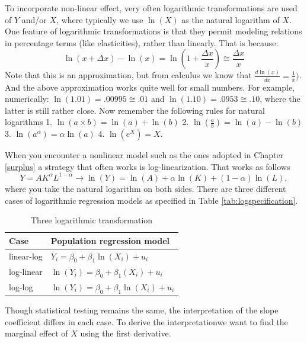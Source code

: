\documentclass[
]{book}
\begin{document}
To incorporate non-linear effect, very often logarithmic transformations are used of \(Y\) and/or \(X\), where typically we use \(\ln(X)\) as the natural logarithm of \(X\). One feature of logarithmic transformations is that they permit modeling relations in percentage terms (like elasticities), rather than linearly. That is because:
\begin{equation}
\ln(x+\Delta x) - \ln(x) = \ln (1 + \frac{\Delta x}{x}) \cong \frac{\Delta x}{x}
\end{equation}
Note that this is an approximation, but from calculus we know that \(\frac{d \ln(x)}{dx}=\frac{1}{x})\). And the above approximation works quite well for small numbers. For example, numerically: \(\ln(1.01) = .00995 \cong .01\) and \(\ln(1.10) = .0953 \cong .10\), where the latter is still rather close. Now remember the following rules for natural logarithms
1. \(\ln(a\times b)= \ln(a)+\ln(b)\)
2. \(\ln(\frac{a}{b}) =\ln(a) - \ln(b)\)
3. \(\ln(a^\alpha) = \alpha \ln(a)\)
4. \(\ln(e^X) = X\).

When you encounter a nonlinear model such as the ones adopted in Chapter \ref{surplus} a strategy that often works is log-linearization. That works as follows
\begin{equation}
Y = A K^\alpha L^{1-\alpha} \rightarrow \ln(Y) = \ln(A) + \alpha \ln(K) + (1-\alpha) \ln(L), 
\end{equation}
where you take the natural logarithm on both sides. There are three different cases of logarithmic regression models as specified in Table \ref{tab:logspecification}.

\begin{table}

\caption{\label{tab:logspecifications}Three logarithmic transformation}
\centering
\begin{tabular}[t]{ll}
\toprule
Case & Population regression model\\
\midrule
linear-log & $Y_i=\beta_0 + \beta_1 \ln(X_i) + u_i$\\
log-linear & $\ln(Y_i)=\beta_0 + \beta_1 (X_i) + u_i$\\
log-log & $\ln(Y_i)=\beta_0 + \beta_1 \ln(X_i) + u_i$\\
\bottomrule
\end{tabular}
\end{table}

Though statistical testing remains the same, the interpretation of the slope coefficient differs in each case. To derive the interpretationwe want to find the marginal effect of \(X\) using the first derivative.
\end{document}
